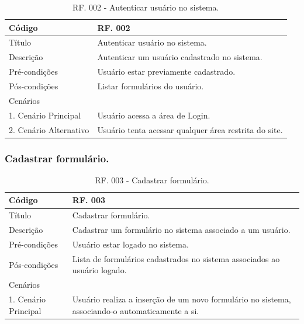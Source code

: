 \documentclass[11pt]{article}
\begin{document}
        \begin{table}[h]
          \begin{center}
            \begin{tabular}{ | p{5cm} | p{10cm} | }
              \hline
              Código\cellcolor{gray} & RF. 002\cellcolor{gray} \\
              \hline
              Título & Autenticar usuário no sistema. \\
              \hline
              Descrição & Autenticar um usuário cadastrado no sistema. \\
              \hline
              Pré-condições & Usuário estar previamente cadastrado. \\
              \hline
              Pós-condições & Listar formulários do usuário. \\
              \hline
              Cenários &   \\
              \hline
              1.  Cenário Principal & Usuário acessa a área de Login. \\
              \hline
              2.  Cenário Alternativo & Usuário tenta acessar qualquer área restrita do site. \\
              \hline
            \end{tabular}
            \caption{RF. 002 - Autenticar usuário no sistema.}
          \end{center}
        \end{table}

      \subsubsection{Cadastrar formulário.}

        \begin{table}[h]
          \begin{center}
            \begin{tabular}{ | p{5cm} | p{10cm} | }
              \hline
              Código\cellcolor{gray} & RF. 003\cellcolor{gray} \\
              \hline
              Título & Cadastrar formulário. \\
              \hline
              Descrição & Cadastrar um formulário no sistema associado a um usuário. \\
              \hline
              Pré-condições & Usuário estar logado no sistema. \\
              \hline
              Pós-condições & Lista de formulários cadastrados no sistema associados ao usuário logado. \\
              \hline
              Cenários &   \\
              \hline
              1.  Cenário Principal & Usuário realiza a inserção de um novo formulário no sistema, associando-o automaticamente a si. \\
              \hline
            \end{tabular}
            \caption{RF. 003 - Cadastrar formulário.}
          \end{center}
        \end{table}
\end{document}
